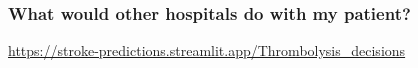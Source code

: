 \begin{frame}
\frametitle{What would other hospitals do with my patient?}

\url{https://stroke-predictions.streamlit.app/Thrombolysis_decisions}

\end{frame}